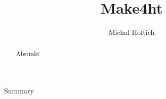 \documentclass{csbulletin}
\begin{document}
\title{Make4ht}
\author{Michal Hoftich}
\maketitle
\begin{abstract}
Abstrakt

\end{abstract}


\begin{summary}
  Summary
\end{summary}
\end{document}
